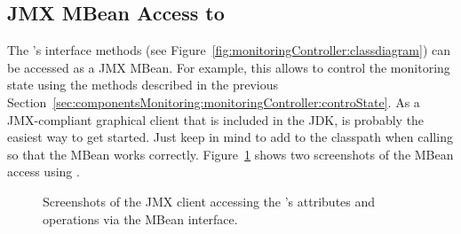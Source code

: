 \subsection{JMX MBean Access to }

The 's %
interface methods (see Figure~\ref{fig:monitoringController:classdiagram}) can be accessed %
as a JMX MBean. For example, this allows to control the monitoring state using %
the methods described in the previous Section~\ref{sec:componentsMonitoring:monitoringController:controState}. %
As a JMX-compliant graphical client that is included in the JDK,  %
is probably the easiest way to get started. Just keep in mind to add \Kieker{} to the classpath when calling  so that the MBean works correctly. Figure~\ref{fig:monitoringController:MBean:jconsole} %
shows two screenshots of the MBean access using .

\begin{figure}[H]\centering
{}
\caption{Screenshots of the  JMX client accessing the 's %
attributes and operations via the MBean interface. %
}
\label{fig:monitoringController:MBean:jconsole}
\end{figure}

